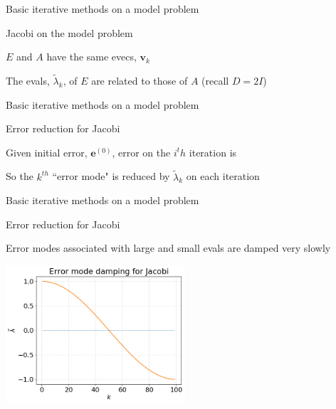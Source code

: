 \documentclass[18pt,xcolor=table]{beamer}
\begin{document}
\begin{frame}{Basic iterative methods on a model problem}
\begin{block}{Jacobi on the model problem}
\bit
\item $E$ and $A$ have the same evecs, $\mathbf{v}_k$
\item The evals, $\tilde\lambda_k$, of $E$ are related to those of $A$ (recall $D = 2I$)
\eit
\end{block}
\end{frame}


\begin{frame}{Basic iterative methods on a model problem}
\begin{block}{Error reduction for Jacobi}
\bit
\item Given initial error, $\mathbf{e}^{(0)}$, error on the $i^th$ iteration is 
\item So the $k^{th}$ ``error mode" is reduced by $\tilde\lambda_k$ on each iteration
\eit
\end{block}
\end{frame}

\begin{frame}{Basic iterative methods on a model problem}
\begin{block}{Error reduction for Jacobi}
\bit
\item Error modes associated with large and small evals are damped very slowly
\eit
\end{block}
\begin{center}
\includegraphics[width=0.5\textwidth]{../figures/jacobiModeDamping}
\end{center}
\end{frame}
\end{document}
